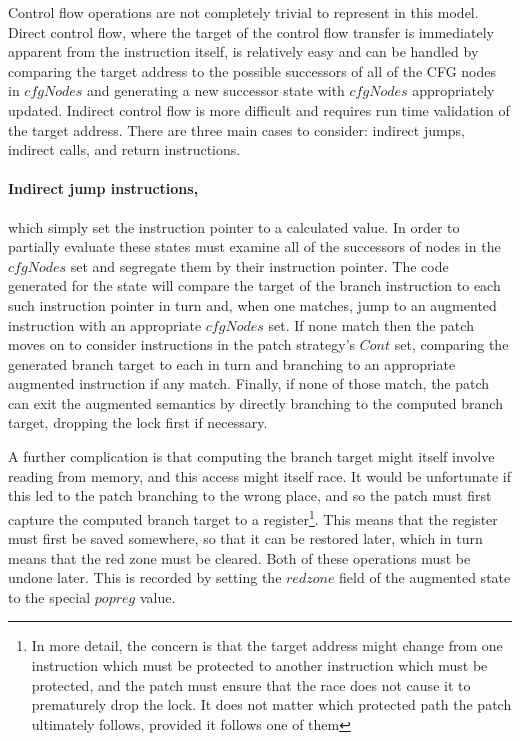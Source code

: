 Control flow operations are not completely trivial to represent in
this model.  Direct control flow, where the target of the control flow
transfer is immediately apparent from the instruction itself, is
relatively easy and can be handled by comparing the target address to
the possible successors of all of the CFG nodes in $\mathit{cfgNodes}$ and
generating a new successor state with $\mathit{cfgNodes}$ appropriately
updated.  Indirect control flow is more difficult and requires run
time validation of the target address.  There are three main cases to
consider: indirect jumps, indirect calls, and return instructions.

\paragraph{Indirect jump instructions,} which simply set the instruction pointer
to a calculated value.  In order to partially
evaluate these states {\technique} must examine all of the successors
of nodes in the $\mathit{cfgNodes}$ set and segregate them by their instruction
pointer.  The code generated for the state will compare the target of
the branch instruction to each such instruction pointer in turn and,
when one matches, jump to an augmented instruction with an appropriate
$\mathit{cfgNodes}$ set.  If none match then the patch moves on to consider
instructions in the patch strategy's $Cont$ set,
comparing the generated branch target to each in turn and branching to
an appropriate augmented instruction if any match.  Finally, if none
of those match, the patch can exit the augmented semantics by directly
branching to the computed branch target, dropping the lock first if
necessary.

A further complication is that computing the branch target might
itself involve reading from memory, and this access might itself race.
It would be unfortunate if this led to the patch branching to the
wrong place, and so the patch must first capture the computed branch
target to a register\footnote{In more detail, the concern is that the
  target address might change from one instruction which must be
  protected to another instruction which must be protected, and the
  patch must ensure that the race does not cause it to prematurely
  drop the lock.  It does not matter which protected path the patch
  ultimately follows, provided it follows one of them}.  This means
that the register must first be saved somewhere, so that it can be
restored later, which in turn means that the red zone must be cleared.
Both of these operations must be undone later.  This is recorded by
setting the $redzone$ field of the augmented state to the special
$popreg$ value.


